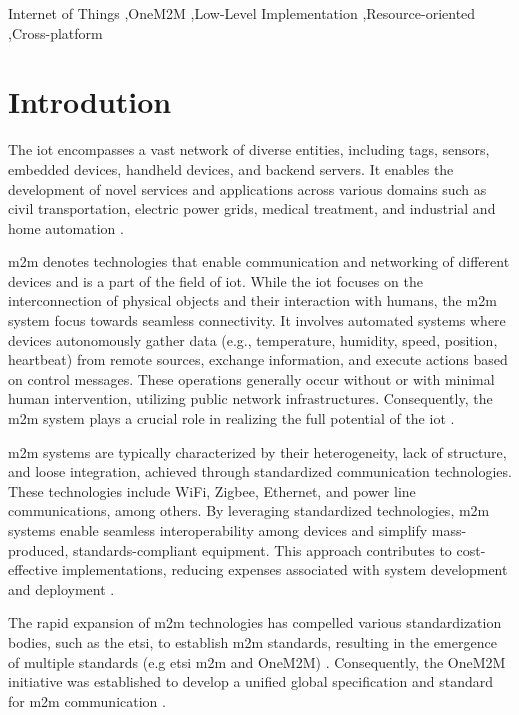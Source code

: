 \documentclass[a4paper,fleqn]{cas-dc}
\begin{document}
\begin{keywords}
Internet of Things \sep OneM2M \sep Low-Level Implementation \sep Resource-oriented \sep Cross-platform 
\end{keywords}


\maketitle

\section{Introdution}

The \gls{iot} encompasses a vast network of diverse entities, including tags, sensors, embedded devices, handheld devices, and backend servers. It enables the development of novel services and applications across various domains such as civil transportation, electric power grids, medical treatment, and industrial and home automation \cite{kim_m2m_2014}.

\gls{m2m} denotes technologies that enable communication and networking of different devices and is a part of the field of \gls{iot}. While the \gls{iot} focuses on the interconnection of physical objects and their interaction with humans, the \gls{m2m} system focus towards seamless connectivity. It involves automated systems where devices autonomously gather data (e.g., temperature, humidity, speed, position, heartbeat) from remote sources, exchange information, and execute actions based on control messages. These operations generally occur without or with minimal human intervention, utilizing public network infrastructures. Consequently, the \gls{m2m} system plays a crucial role in realizing the full potential of the \gls{iot} \cite{kim_m2m_2014, lawton_machine_2004, pticek_architecture_2015}.

\gls{m2m} systems are typically characterized by their heterogeneity, lack of structure, and loose integration, achieved through standardized communication technologies. These technologies include WiFi, Zigbee, Ethernet, and power line communications, among others. By leveraging standardized technologies, \gls{m2m} systems enable seamless interoperability among devices and simplify mass-produced, standards-compliant equipment. This approach contributes to cost-effective implementations, reducing expenses associated with system development and deployment \cite{lawton_machine_2004, cao_survey_2016}.

The rapid expansion of \gls{m2m} technologies has compelled various standardization bodies, such as the \gls{etsi}, to establish \gls{m2m} standards, resulting in the emergence of multiple standards (e.g \gls{etsi} \gls{m2m} and OneM2M) \cite{Sicari2015}. Consequently, the OneM2M initiative was established to develop a unified global specification and standard for \gls{m2m} communication \cite{pticek_architecture_2015}.
\end{document}

